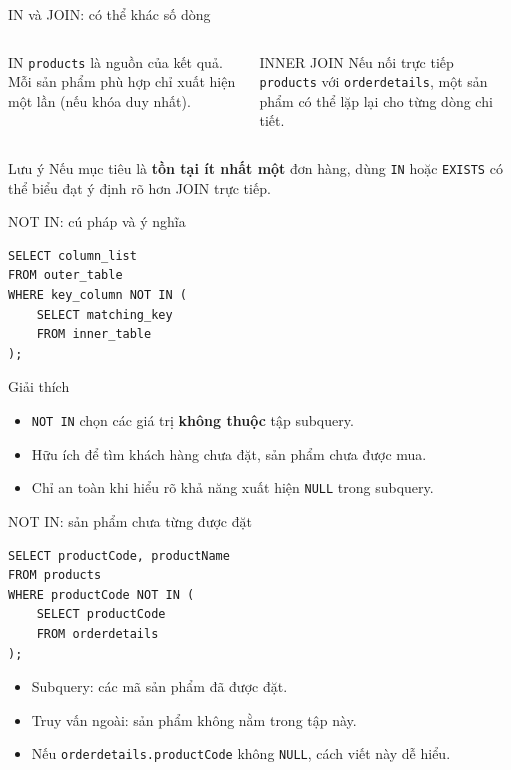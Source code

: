 \documentclass[aspectratio=169,10pt]{beamer}
\newcommand{\code}[1]{\texttt{#1}}
\begin{document}
\begin{frame}[fragile]{IN và JOIN: có thể khác số dòng}
\small
\begin{columns}[T,onlytextwidth]
\begin{block}{IN}
\code{products} là nguồn của kết quả. Mỗi sản phẩm phù hợp chỉ xuất hiện một lần (nếu khóa duy nhất).
\end{block}
\begin{block}{INNER JOIN}
Nếu nối trực tiếp \code{products} với \code{orderdetails}, một sản phẩm có thể lặp lại cho từng dòng chi tiết.
\end{block}
\end{columns}
\vspace{.5em}
\begin{alertblock}{Lưu ý}
\small Nếu mục tiêu là \textbf{tồn tại ít nhất một} đơn hàng, dùng \code{IN} hoặc \code{EXISTS} có thể biểu đạt ý định rõ hơn JOIN trực tiếp.
\end{alertblock}
\end{frame}

\begin{frame}[fragile]{NOT IN: cú pháp và ý nghĩa}
\begin{lstlisting}
SELECT column_list
FROM outer_table
WHERE key_column NOT IN (
    SELECT matching_key
    FROM inner_table
);
\end{lstlisting}
\begin{block}{Giải thích}
\begin{itemize}
\item \code{NOT IN} chọn các giá trị \textbf{không thuộc} tập subquery.
\item Hữu ích để tìm khách hàng chưa đặt, sản phẩm chưa được mua.
\item Chỉ an toàn khi hiểu rõ khả năng xuất hiện \code{NULL} trong subquery.
\end{itemize}
\end{block}
\end{frame}

\begin{frame}[fragile]{NOT IN: sản phẩm chưa từng được đặt}
\begin{lstlisting}
SELECT productCode, productName
FROM products
WHERE productCode NOT IN (
    SELECT productCode
    FROM orderdetails
);
\end{lstlisting}
\begin{itemize}
\item Subquery: các mã sản phẩm đã được đặt.
\item Truy vấn ngoài: sản phẩm không nằm trong tập này.
\item Nếu \code{orderdetails.productCode} không \code{NULL}, cách viết này dễ hiểu.
\end{itemize}
\end{frame}
\end{document}
